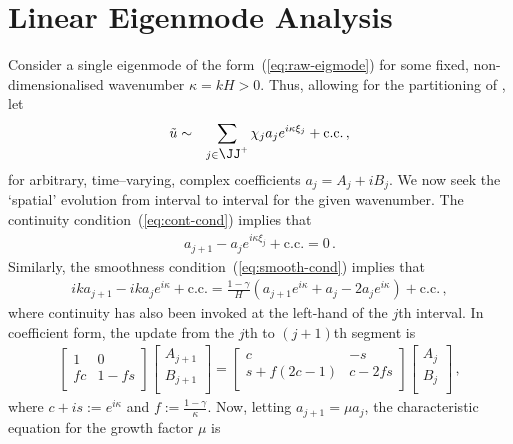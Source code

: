 \documentclass[12pt,a5paper]{article}
\begin{document}
\section{Linear Eigenmode Analysis}\label{sec:eig:modes}
Consider a single eigenmode of the form~(\ref{eq:raw-eigmode}) for some fixed, non-dimensionalised 
wavenumber $\kappa=kH>0$. 
Thus, allowing for the partitioning of \XX, let
\begin{eqnarray}
\tilde{u} & \sim & \sum_{j\in\JJ^+} \chi_j a_j e^{i\kappa\xi_j} + \text{c.c.}\,,
\end{eqnarray}
for arbitrary, time--varying, complex coefficients $a_j=A_j+iB_j$. 
We now seek the `spatial' evolution from interval to interval for the given wavenumber.
The continuity condition~(\ref{eq:cont-cond}) implies that
\begin{eqnarray}
a_{j+1} - a_j e^{i\kappa\xi_j} + \text{c.c.} = 0\,.
\end{eqnarray}
Similarly, the smoothness condition~(\ref{eq:smooth-cond}) implies that 
\begin{eqnarray}
ik a_{j+1} -ik a_j e^{i\kappa} + \text{c.c.} =  
\frac{1-\gamma}{H}\left(
a_{j+1} e^{i\kappa} + a_j - 2 a_j e^{i\kappa}
\right)
+ \text{c.c.}\,,
\end{eqnarray}
where continuity has also been invoked at the left-hand of the $j$th interval.
In coefficient form, the update from the $j$th to $(j+1)$th segment is
\begin{eqnarray}
\left[\begin{array}{cc}
1 & 0\\
fc & 1-fs\\
\end{array}\right]
\left[\begin{array}{c}
A_{j+1}\\
B_{j+1}\\
\end{array}\right]
=
\left[\begin{array}{cc}
c & -s\\
s+f(2c-1) & c-2fs\\
\end{array}\right]
\left[\begin{array}{c}
A_{j}\\
B_{j}\\
\end{array}\right]\,,
\end{eqnarray}
where $c+is:=e^{i\kappa}$ and $f:=\frac{1-\gamma}{\kappa}$.
Now, letting $a_{j+1}=\mu a_j$, the characteristic equation for 
the growth factor $\mu$ is
\end{document}
